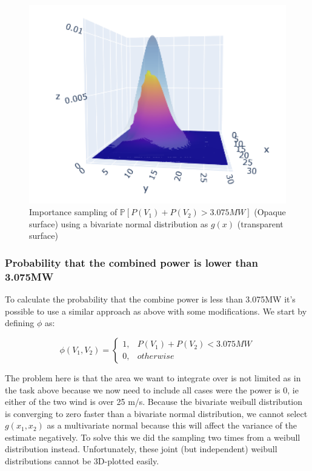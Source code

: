 \documentclass[a4paper]{article}
\begin{document}
\begin{figure}[H]
    \centering
    \includegraphics[width = 1.0\textwidth]{images/probability3D}
    \caption{Importance sampling of $\mathbb{P}[P(V_1) + P(V_2) > 3.075 MW]$ (Opaque surface) using a bivariate normal distribution as $g(x)$ (transparent surface)}
    \label{fig:3Dprob}
\end{figure}

\subsubsection*{Probability that the combined power is lower than 3.075MW}

To calculate the probability that the combine power is less than 3.075MW it's possible to use a similar approach as above with some modifications. We start by defining $\phi$ as:

\begin{equation}
    \phi(V_1, V_2)=\begin{cases}
        1, & P(V_1) + P(V_2) < 3.075MW\\ 
        0, & otherwise 
    \end{cases}
\end{equation}

The problem here is that the area we want to integrate over is not limited as in the task above because we now need to include all cases were the power is 0, ie either of the two wind is over 25 m/s. Because the bivariate weibull distribution is converging to zero faster than a bivariate normal distribution, we cannot select $g(x_1, x_2)$ as a multivariate normal because this will affect the variance of the estimate negatively. To solve this we did the sampling two times from a weibull distribution instead. Unfortunately, these joint (but independent) weibull distributions cannot be 3D-plotted easily.
\end{document}
